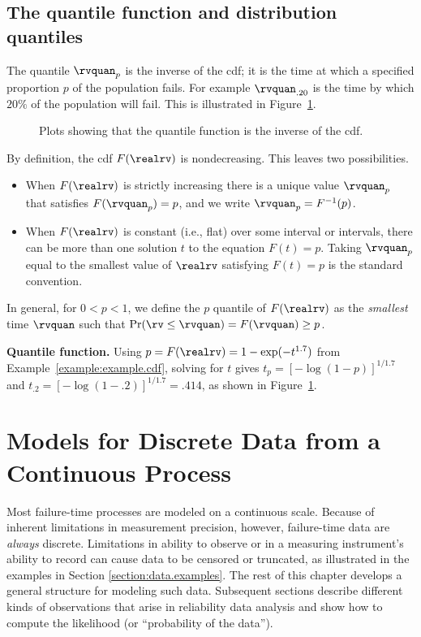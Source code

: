 \subsection{The quantile function and distribution quantiles}
\label{section:np.quantile.def}
The quantile $\rvquan_{p}$ is the inverse of the cdf; it
is the time at which a specified proportion $p$ of the
population fails. For example $\rvquan_{.20}$ is the time
by which $20 \%$ of the population will fail.  This is illustrated in
Figure~\ref{figure:quantile.def.ps}.
\begin{figure}
\caption{Plots showing that the quantile function is the
inverse of the cdf.}
\label{figure:quantile.def.ps}
\end{figure}
By definition, the cdf $F(\realrv)$ is nondecreasing. This leaves two
possibilities.
\begin{itemize}
\item
When $F(\realrv)$ is strictly increasing there is a unique value
$\rvquan_{p}$ that satisfies $F(\rvquan_{p})=p$, and we write
$\rvquan_{p}=F^{-1}(p)$.
\item 
When $F(\realrv)$ is constant (i.e., flat)
over some interval or intervals, there can
be more than one solution $t$ to the equation $F(t)=p$.  Taking
$\rvquan_{p}$ equal to the smallest value of $\realrv$ satisfying
$F(t)=p$ is the standard convention.
\end{itemize}
In general, for $0 < p < 1 $, we define the $p$ quantile of
$F(\realrv)$ as the {\em smallest} time $\rvquan$ such that
$\Pr(\rv \le \rvquan)=F(\rvquan)\geq p$.

\begin{example}
\label{example:example.quantile}{\bf Quantile function.}
Using $p=F(\realrv)=1-\exp(-t^{1.7})$ from
Example~\ref{example:example.cdf}, solving 
for $t$ gives $t_{p} = [-\log(1-p)]^{1/1.7}$
and $t_{.2} = [-\log(1-.2)]^{1/1.7} = .414$,
as shown in Figure~\ref{figure:quantile.def.ps}.
\end{example}

\section{Models for Discrete Data from a Continuous Process}
\label{section:model.for.discrete.data}
Most failure-time processes are modeled on a continuous scale.
Because of inherent limitations in measurement precision, however,
failure-time
data are {\em always} discrete. Limitations in ability to
observe or in a measuring instrument's ability to record can cause
data to be censored or truncated, as illustrated in the examples
in Section \ref{section:data.examples}.  The rest of this chapter
develops a general structure for modeling such data. Subsequent sections
describe different kinds of observations that arise in reliability
data analysis and show how to compute the likelihood (or ``probability
of the data'').

